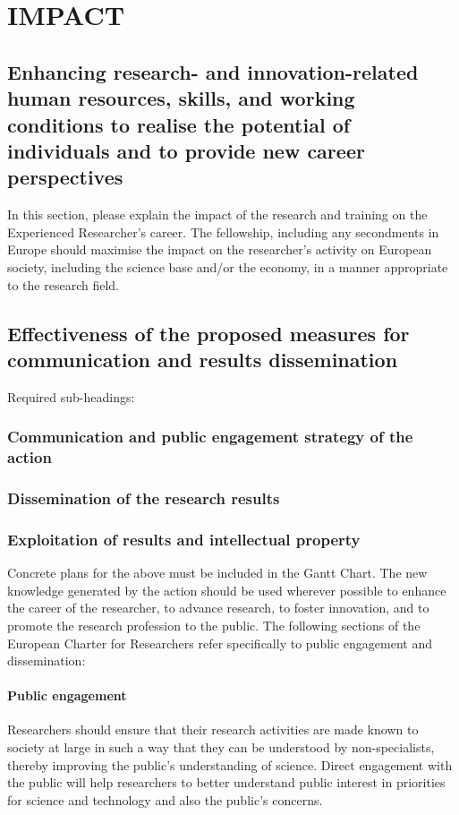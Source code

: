 \section{IMPACT}
\label{sec:impact}

\subsection{Enhancing research- and innovation-related human resources, skills, and working conditions to realise the potential of individuals and to provide new career perspectives}
\label{sec:enhancement}

In this section, please explain the impact of the research and training on the Experienced Researcher's career. The fellowship, including any secondments in Europe should maximise the impact on the researcher's activity on European society, including the science base and/or the economy, in a manner appropriate to the research field. 

\subsection{Effectiveness of the proposed measures for communication and results dissemination}

Required sub-headings: 

\subsubsection*{Communication and public engagement strategy of the action}
\subsubsection*{Dissemination of the research results}
\subsubsection*{Exploitation of results and intellectual property}

Concrete plans for the above must be included in the Gantt Chart. The new knowledge generated by the action should be used wherever possible to enhance the career of the researcher, to advance research, to foster innovation, and to promote the research profession to the public. 
The following sections of the European Charter for Researchers refer specifically to public engagement and dissemination:

\paragraph{Public engagement}
Researchers should ensure that their research activities are made known to society at large in such a way that they can be understood by non-specialists, thereby improving the public's understanding of science. Direct engagement with the public will help researchers to better understand public interest in priorities for science and technology and also the public's concerns. 

